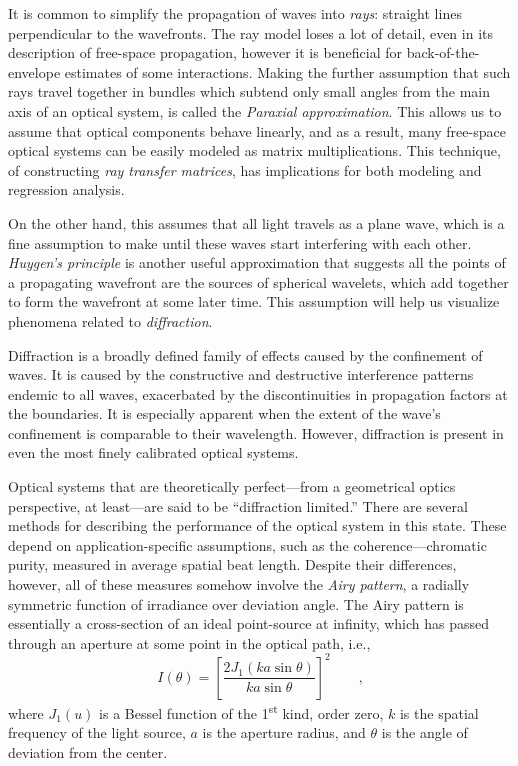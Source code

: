 \documentclass[a4paper,10pt]{report}
\numberwithin{equation}{section}
\begin{document}
It is common to simplify the propagation of waves into \emph{rays}: straight lines perpendicular to the wavefronts. The ray model loses a lot of detail, even in its description of free-space propagation, however it is beneficial for back-of-the-envelope estimates of some interactions. \cite[p.~95]{Hecht1987} Making the further assumption that such rays travel together in bundles which subtend only small angles from the main axis of an optical system, is called the \emph{Paraxial approximation}. This allows us to assume that optical components behave linearly, and as a result, many free-space optical systems can be easily modeled as matrix multiplications. \cite[p.~444]{Goodman2005} This technique, of constructing \emph{ray transfer matrices}, has implications for both modeling and regression analysis.

On the other hand, this assumes that all light travels as a plane wave, which is a fine assumption to make until these waves start interfering with each other. \emph{Huygen's principle} is another useful approximation that suggests all the points of a propagating wavefront are the sources of spherical wavelets, which add together to form the wavefront at some later time. This assumption will help us visualize phenomena related to \emph{diffraction}. \cite[p.~100]{Hecht1987}

Diffraction is a broadly defined family of effects caused by the confinement of waves. It is caused by the constructive and destructive interference patterns endemic to all waves, exacerbated by the discontinuities in propagation factors at the boundaries. It is especially  apparent when the extent of the wave's confinement is comparable to their wavelength. \cite[p.~32]{Goodman2005} However, diffraction is present in even the most finely calibrated optical systems. 

Optical systems that are theoretically perfect---from a geometrical optics perspective, at least---are said to be ``diffraction limited.'' \cite[p.~143]{Hecht1987} There are several methods for describing the performance of the optical system in this state. These depend on application-specific assumptions, such as the coherence---chromatic purity, measured in average spatial beat length. Despite their differences, however, all of these measures somehow involve the \emph{Airy pattern}, a radially symmetric function of irradiance over deviation angle. The Airy pattern is essentially a cross-section of an ideal point-source at infinity, which has passed through an aperture at some point in the optical path, i.e., \cite[p.~445]{Hecht1987}
\begin{equation}\label{airy_patt}
I(\theta) = \left[ \frac{2 J_1 (ka \sin{\theta})}{ka \sin{\theta}} \right]^2 \qquad \text{,}
\end{equation}
where $J_1(u)$ is a Bessel function of the 1\textsuperscript{st} kind, order zero, $k$ is the spatial frequency of the light source, $a$ is the aperture radius, and $\theta$ is the angle of deviation from the center. \cite[p.~445]{Hecht1987}
\end{document}
